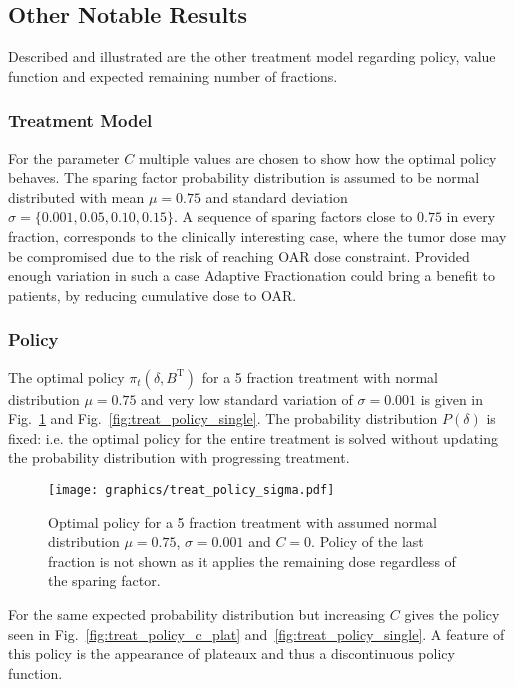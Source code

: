 \documentclass[\relativeRoot/ada.tex]{subfiles}
\begin{document}

\subsection{Other Notable Results}

Described and illustrated are the other treatment model regarding policy, value function and expected remaining number of fractions.

\subsubsection{Treatment Model}

For the parameter $C$ multiple values are chosen to show how the optimal policy behaves. The sparing factor probability distribution is assumed to be normal distributed with mean $\mu=0.75$ and standard deviation $\sigma = \{ 0.001, 0.05, 0.10, 0.15\}$. A sequence of sparing factors close to $0.75$ in every fraction, corresponds to the clinically interesting case, where the tumor dose may be compromised due to the risk of reaching OAR dose constraint. Provided enough variation in such a case Adaptive Fractionation could bring a benefit to patients, by reducing cumulative dose to OAR.

\subsubsection{Policy}

The optimal policy $\pi_t(\delta, B^{\text{T}})$ for a 5 fraction treatment with normal distribution $\mu=0.75$ and very low standard variation of $\sigma=0.001$ is given in Fig.~\ref{fig:treat_policy_sigma} and Fig.~\ref{fig:treat_policy_single}. The probability distribution $P(\delta)$ is fixed: i.e. the optimal policy for the entire treatment is solved without updating the probability distribution with progressing treatment.

\begin{figure}[!htb]
    \centering
    \texttt{[image: graphics/treat\_policy\_sigma.pdf]}
    \caption{Optimal policy for a 5 fraction treatment with assumed normal distribution $\mu=0.75$, $\sigma=0.001$ and $C=0$. Policy of the last fraction is not shown as it applies the remaining dose regardless of the sparing factor.}
    \label{fig:treat_policy_sigma}
\end{figure}

For the same expected probability distribution but increasing $C$ gives the policy seen in Fig.~\ref{fig:treat_policy_c_plat} and~\ref{fig:treat_policy_single}. A feature of this policy is the appearance of plateaux and thus a discontinuous policy function.
\end{document}
